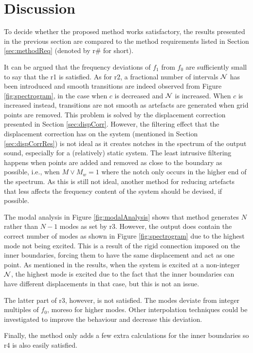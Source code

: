\section{Discussion}
To decide whether the proposed method works satisfactory, the results presented in the previous section are compared to the method requirements listed in Section \ref{sec:methodReq} (denoted by r\# for short). 

It can be argued that the frequency deviations of $f_1$ from $f_0$ are sufficiently small to say that the r1 is satisfied. As for r2, a fractional number of intervals $\mathcal{N}$ has been introduced and smooth transitions are indeed observed from Figure \ref{fig:spectrogram}, in the case when $c$ is decreased and $\mathcal{N}$ is increased. When $c$ is increased instead, transitions are not smooth as artefacts are generated when grid points are removed. This problem is solved by the displacement correction presented in Section \ref{sec:dispCorr}. However, the filtering effect that the displacement correction has on the system (mentioned in Section \ref{sec:dispCorrRes}) is not ideal as it creates notches in the spectrum of the output sound, especially for a (relatively) static system. The least intrusive filtering happens when points are added and removed as close to the boundary as possible, i.e., when $M \vee M_w = 1$ where the notch only occurs in the higher end of the spectrum. As this is still not ideal, another method for reducing artefacts that less affects the frequency content of the system should be devised, if possible. 

The modal analysis in Figure \ref{fig:modalAnalysis} shows that method generates $ N$ rather than $N - 1$ modes as set by r3. However, the output does contain the correct number of modes as shown in Figure \ref{fig:spectrogram} due to the highest mode not being excited. This is a result of the rigid connection imposed on the inner boundaries, forcing them to have the same displacement and act as one point. As mentioned in the results, when the system is excited at a non-integer $\mathcal{N}$, the highest mode is excited due to the fact that the inner boundaries can have different displacements in that case, but this is not an issue.

The latter part of r3, however, is not satisfied. The modes deviate from integer multiples of $f_0$, moreso for higher modes. Other interpolation techniques could be investigated to improve the behaviour and decrease this deviation.

Finally, the method only adds a few extra calculations for the inner boundaries so r4 is also easily satisfied. 
\\


